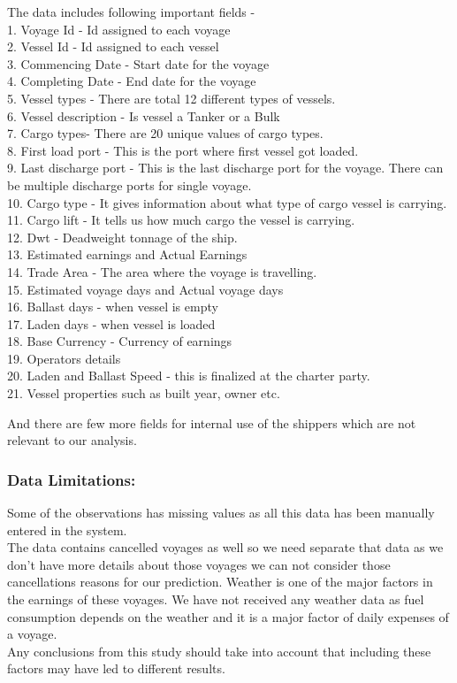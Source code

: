 \documentclass[]{article}
\begin{document}
The data includes following important fields -\\
1. Voyage Id - Id assigned to each voyage\\
2. Vessel Id - Id assigned to each vessel\\
3. Commencing Date - Start date for the voyage\\
4. Completing Date - End date for the voyage\\
5. Vessel types - There are total 12 different types of vessels.\\
6. Vessel description - Is vessel a Tanker or a Bulk\\
7. Cargo types- There are 20 unique values of cargo types.\\
8. First load port - This is the port where first vessel got loaded.\\
9. Last discharge port - This is the last discharge port for the voyage.
There can be multiple discharge ports for single voyage.\\
10. Cargo type - It gives information about what type of cargo vessel is
carrying.\\
11. Cargo lift - It tells us how much cargo the vessel is carrying.\\
12. Dwt - Deadweight tonnage of the ship.\\
13. Estimated earnings and Actual Earnings\\
14. Trade Area - The area where the voyage is travelling.\\
15. Estimated voyage days and Actual voyage days\\
16. Ballast days - when vessel is empty\\
17. Laden days - when vessel is loaded\\
18. Base Currency - Currency of earnings\\
19. Operators details\\
20. Laden and Ballast Speed - this is finalized at the charter party.\\
21. Vessel properties such as built year, owner etc.

And there are few more fields for internal use of the shippers which are
not relevant to our analysis.

\subsubsection{\texorpdfstring{\textbf{Data
Limitations:}}{Data Limitations:}}\label{data-limitations}

Some of the observations has missing values as all this data has been
manually entered in the system.\\
The data contains cancelled voyages as well so we need separate that
data as we don't have more details about those voyages we can not
consider those cancellations reasons for our prediction. Weather is one
of the major factors in the earnings of these voyages. We have not
received any weather data as fuel consumption depends on the weather and
it is a major factor of daily expenses of a voyage.\\
Any conclusions from this study should take into account that including
these factors may have led to different results.
\end{document}
